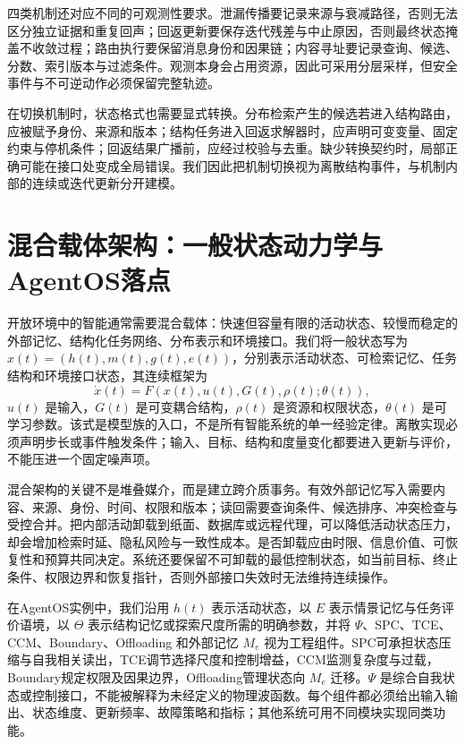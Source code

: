 四类机制还对应不同的可观测性要求。泄漏传播要记录来源与衰减路径，否则无法区分独立证据和重复回声；回返更新要保存迭代残差与中止原因，否则最终状态掩盖不收敛过程；路由执行要保留消息身份和因果链；内容寻址要记录查询、候选、分数、索引版本与过滤条件。观测本身会占用资源，因此可采用分层采样，但安全事件与不可逆动作必须保留完整轨迹。

在切换机制时，状态格式也需要显式转换。分布检索产生的候选若进入结构路由，应被赋予身份、来源和版本；结构任务进入回返求解器时，应声明可变变量、固定约束与停机条件；回返结果广播前，应经过校验与去重。缺少转换契约时，局部正确可能在接口处变成全局错误。我们因此把机制切换视为离散结构事件，与机制内部的连续或迭代更新分开建模。

\section{混合载体架构：一般状态动力学与AgentOS落点}
\label{sec:section_8675}

开放环境中的智能通常需要混合载体：快速但容量有限的活动状态、较慢而稳定的外部记忆、结构化任务网络、分布表示和环境接口。我们将一般状态写为 $x(t)=(h(t),m(t),g(t),e(t))$，分别表示活动状态、可检索记忆、任务结构和环境接口状态，其连续框架为
\[
\dot x(t)=F(x(t),u(t),G(t),\rho(t);\theta(t)),
\]
$u(t)$ 是输入，$G(t)$ 是可变耦合结构，$\rho(t)$ 是资源和权限状态，$\theta(t)$ 是可学习参数。该式是模型族的入口，不是所有智能系统的单一经验定律。离散实现必须声明步长或事件触发条件；输入、目标、结构和度量变化都要进入更新与评价，不能压进一个固定噪声项。

混合架构的关键不是堆叠媒介，而是建立跨介质事务。有效外部记忆写入需要内容、来源、身份、时间、权限和版本；读回需要查询条件、候选排序、冲突检查与受控合并。把内部活动卸载到纸面、数据库或远程代理，可以降低活动状态压力，却会增加检索时延、隐私风险与一致性成本。是否卸载应由时限、信息价值、可恢复性和预算共同决定。系统还要保留不可卸载的最低控制状态，如当前目标、终止条件、权限边界和恢复指针，否则外部接口失效时无法维持连续操作。

在AgentOS实例中，我们沿用 $h(t)$ 表示活动状态，以 $E$ 表示情景记忆与任务评价语境，以 $\Theta$ 表示结构记忆或探索尺度所需的明确参数，并将 $\Psi$、SPC、TCE、CCM、Boundary、Offloading 和外部记忆 $M_e$ 视为工程组件。SPC可承担状态压缩与自我相关读出，TCE调节选择尺度和控制增益，CCM监测复杂度与过载，Boundary规定权限及因果边界，Offloading管理状态向 $M_e$ 迁移。$\Psi$ 是综合自我状态或控制接口，不能被解释为未经定义的物理波函数。每个组件都必须给出输入输出、状态维度、更新频率、故障策略和指标；其他系统可用不同模块实现同类功能。


